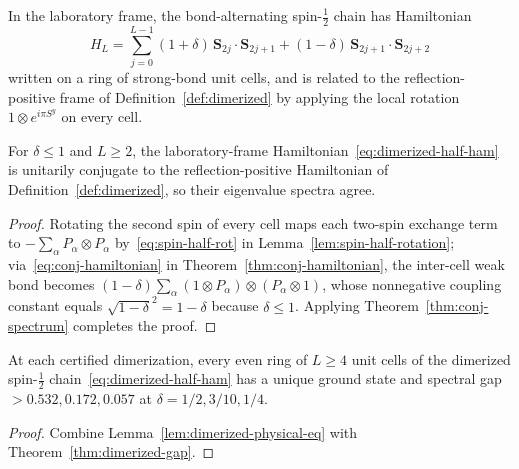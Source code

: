 \begin{definition}
  \label{def:dimerized-physical}
  \leanok
  In the laboratory frame, the bond-alternating spin-\(\tfrac12\) chain has Hamiltonian
  \begin{equation}
    \label{eq:dimerized-half-ham}
    H_L = \sum_{j=0}^{L-1} (1+\delta)\, \mathbf S_{2j} \cdot \mathbf S_{2j+1} + (1-\delta)\,
    \mathbf S_{2j+1} \cdot \mathbf S_{2j+2}
  \end{equation}
  written on a ring of strong-bond unit cells, and is related to the reflection-positive frame of
  Definition~\ref{def:dimerized} by applying the local rotation \(1 \otimes e^{i\pi S^y}\) on every
  cell.
\end{definition}

\begin{lemma}
  \label{lem:dimerized-physical-eq}
  \leanok
  For \(\delta \le 1\) and \(L \ge 2\), the laboratory-frame Hamiltonian~\eqref{eq:dimerized-half-ham}
  is unitarily conjugate to the reflection-positive Hamiltonian of Definition~\ref{def:dimerized},
  so their eigenvalue spectra agree.
\end{lemma}
\begin{proof}
  \leanok
  Rotating the second spin of every cell maps each two-spin exchange term to
  \(-\sum_\alpha P_\alpha \otimes P_\alpha\) by~\eqref{eq:spin-half-rot} in
  Lemma~\ref{lem:spin-half-rotation}; via~\eqref{eq:conj-hamiltonian} in
  Theorem~\ref{thm:conj-hamiltonian}, the inter-cell weak bond becomes
  \((1-\delta) \sum_\alpha (1 \otimes P_\alpha) \otimes (P_\alpha \otimes 1)\), whose nonnegative
  coupling constant equals \(\sqrt{1-\delta}^2 = 1 - \delta\) because \(\delta \le 1\). Applying
  Theorem~\ref{thm:conj-spectrum} completes the proof.
\end{proof}

\begin{theorem}
  \label{thm:dimerized-physical-gap}
  \leanok
  At each certified dimerization, every even ring of \(L \ge 4\) unit cells of the dimerized
  spin-\(\tfrac12\) chain~\eqref{eq:dimerized-half-ham} has a unique ground state and spectral gap
  \(> 0.532, 0.172, 0.057\) at \(\delta = 1/2, 3/10, 1/4\).
\end{theorem}
\begin{proof}
  \leanok
  Combine Lemma~\ref{lem:dimerized-physical-eq} with Theorem~\ref{thm:dimerized-gap}.
\end{proof}


